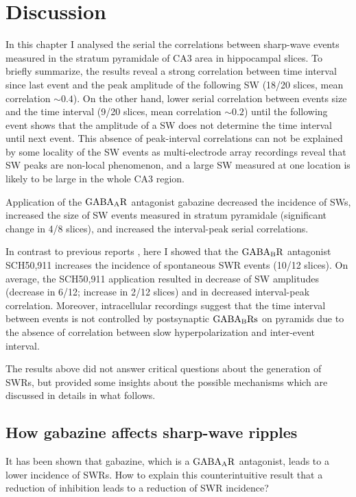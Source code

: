 \section{Discussion}
  In this chapter I analysed the serial the correlations between sharp-wave
  events measured in the stratum pyramidale of CA3 area in hippocampal slices.
  To briefly summarize, the results reveal a strong correlation between time
  interval since last event and the peak amplitude of the following SW (18/20
  slices, mean correlation $\sim 0.4$). On the other hand, lower serial
  correlation between events size and the time interval (9/20 slices, mean
  correlation $\sim 0.2$) until the following event shows that the amplitude of
  a SW does not determine the time interval until next event. This absence of
  peak-interval correlations can not be explained by some locality of the SW
  events as multi-electrode array recordings reveal that SW peaks are non-local
  phenomenon, and a large SW measured at one location is likely to be large in
  the whole CA3 region. 
  
  Application of the $\rm GABA_AR$ antagonist gabazine decreased the
  incidence of SWs, increased the size of SW events measured in stratum
  pyramidale (significant change in 4/8 slices), and increased the
  interval-peak serial correlations. 

  In contrast to previous reports \citep[i.e.,][]{Hollnagel2014, Hofer2015},
  here I showed that the $\rm GABA_BR$ antagonist SCH50,911 increases the
  incidence of spontaneous SWR events (10/12 slices). On average,
  the SCH50,911 application resulted in decrease of SW amplitudes (decrease in
  6/12; increase in 2/12 slices) and in decreased interval-peak correlation.
  Moreover, intracellular recordings suggest that the time interval between
  events is not controlled by postsynaptic $\rm GABA_B Rs$ on pyramids due to
  the absence of correlation between slow hyperpolarization and inter-event
  interval.

  The results above did not answer critical questions about the generation of
  SWRs, but provided some insights about the possible mechanisms which
  are discussed in details in what follows.
    
  \subsection{How gabazine affects sharp-wave ripples} 
  \label{sec:disc_gabazine}
    It has been shown that gabazine, which is a $\rm GABA_AR$ 
    antagonist, leads to a lower incidence of SWRs. How to explain this
    counterintuitive result that a reduction of inhibition leads to a reduction
    of SWR incidence?

